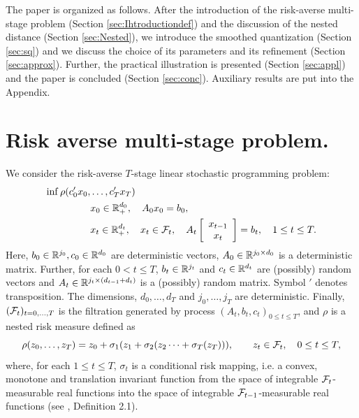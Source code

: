 \documentclass{article}              %
\begin{document}
The paper is organized as follows. After the introduction of the risk-averse
multi-stage problem (Section \ref{sec:Ihtroductiondef}) and the discussion
of the nested distance (Section \ref{sec:Nested}), we introduce the
smoothed quantization (Section \ref{sec:sq}) and we discuss the choice
of its parameters and its refinement (Section \ref{sec:approx}).
Further, the practical illustration is presented (Section \ref{sec:appl})
and the paper is concluded (Section \ref{sec:conc}). Auxiliary results
are put into the Appendix.

\section{\label{sec:Ihtroductiondef} Risk averse multi-stage problem.}

We consider the risk-averse $T$-stage linear stochastic programming
problem:
\begin{equation}\label{eq:p}
\begin{split}
\inf\rho(c'_{0}x_{0},&\dots,c'_{T}x_{T})\\
&x_{0}\in\mathbb{R}_{+}^{d_{0}},\quad A_{0}x_{0}=b_{0},\\
&x_{t}\in\mathbb{R}_{+}^{d_{t}},\quad x_{t}\in\mathcal{F}_{t},\quad A_{t}
\left[\begin{array}{c}
x_{t-1}\\
x_{t}
\end{array}\right]=b_{t},\quad1\leq t\leq T.
\end{split}
\end{equation}
Here, $b_{0}\in\mathbb{R}^{j_{0}},c_{0}\in\mathbb{R}^{d_{0}}$ are deterministic vectors,
$A_{0}\in\mathbb{R}^{j_{0}\times d_{0}}$ is a deterministic matrix. Further,
for each $0<t\leq T$, $b_{t}\in\mathbb{R}^{j_{t}}$ and $c_{t}\in\mathbb{R}^{d_{t}}$ are
(possibly) random vectors and $A_{t}\in\mathbb{R}^{j_{t}\times (d_{t-1} + d_t)}$ is
a (possibly) random matrix. Symbol $'$ denotes transposition. The dimensions, $d_{0},\dots,d_{T}$ and
$j_{0},\dots,j_{T}$ are deterministic. Finally, $(\mathcal{F}_{t})_{t=0,\dots,T}$
is the filtration generated by process $(A_{t},b_{t},c_{t})_{0\leq t\leq T}$,
and $\rho$ is a nested risk measure defined as
\[
\rho(z_{0},\dots,z_{T})=z_{0}+\sigma_{1}(z_{1}+\sigma_{2}(z_{2}\dots+\sigma_{T}(z_{T}))),\qquad z_{t}\in\mathcal{F}_{t},\quad0\leq t\leq T,
\]
where, for each $1\leq t\leq T$, $\sigma_{t}$ is a conditional risk
mapping, i.e. a convex, monotone and translation invariant function
from the space of integrable $\mathcal{F}_{t}$-measurable real functions into
the space of integrable $\mathcal{F}_{t-1}$-measurable real functions (see
\cite{ruszczynski2006conditional}, Definition 2.1). 
\end{document}
